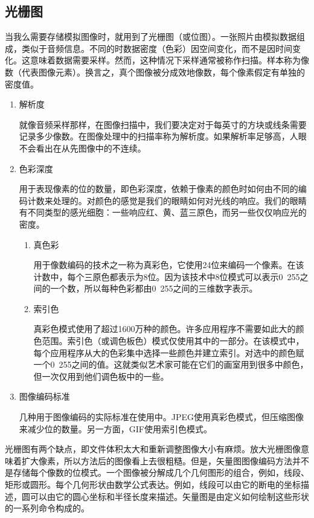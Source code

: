 \subsection{光栅图}
当我么需要存储模拟图像时，就用到了光栅图（或位图）。一张照片由模拟数据组成，类似于音频信息。不同的时数据密度（色彩）因空间变化，而不是因时间变化。这意味着数据需要采样。然而，这种情况下采样通常被称作扫描。样本称为像数（代表图像元素）。换言之，真个图像被分成效地像数，每个像素假定有单独的密度值。
\begin{enumerate}
	\item 解析度

	就像音频采样那样，在图像扫描中，我们要决定对于每英寸的方块或线条需要记录多少像数。在图像处理中的扫描率称为解析度。如果解析率足够高，人眼不会看出在从先图像中的不连续。
	\item 色彩深度

	用于表现像素的位的数量，即色彩深度，依赖于像素的颜色时如何由不同的编码计数来处理的。对颜色的感觉是我们的眼睛如何对光线的响应。我们的眼睛有不同类型的感光细胞：一些响应红、黄、蓝三原色，而另一些仅仅响应光的密度。
	\begin{enumerate}
		\item 真色彩

		用于像数编码的技术之一称为真彩色，它使用24位来编码一个像素。在该计数中，每个三原色都表示为8位。因为该技术中8位模式可以表示0~255之间的一个数，所以每种色彩都由0~255之间的三维数字表示。
		\item 索引色

		真彩色模式使用了超过1600万种的颜色。许多应用程序不需要如此大的颜色范围。索引色（或调色板色）模式仅使用其中的一部分。在该模式中，每个应用程序从大的色彩集中选择一些颜色并建立索引。对选中的颜色赋一个0~255之间的值。这就类似艺术家可能在它们的画室用到很多中颜色，但一次仅用到他们调色板中的一些。
	\end{enumerate}
	\item 图像编码标准

	几种用于图像编码的实际标准在使用中。JPEG使用真彩色模式，但压缩图像来减少位的数量。另一方面，GIF使用索引色模式。
\end{enumerate}
光栅图有两个缺点，即文件体积太大和重新调整图像大小有麻烦。放大光栅图像意味着扩大像素，所以方法后的图像看上去很粗糙。但是，矢量图图像编码方法并不是存储每个像数的位模式。一个图像被分解成几个几何图形的组合，例如，线段、矩形或圆形。每个几何形状由数学公式表达。例如，线段可以由它的断电的坐标描述，圆可以由它的圆心坐标和半径长度来描述。矢量图是由定义如何绘制这些形状的一系列命令构成的。

